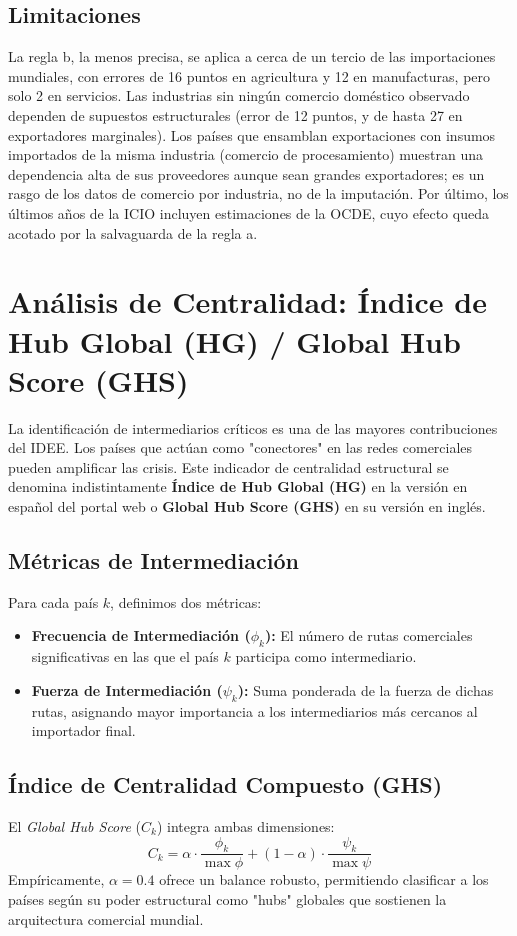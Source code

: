 \documentclass[final,1p,times,authoryear]{elsarticle}
\begin{document}
\subsection{Limitaciones}
La regla b, la menos precisa, se aplica a cerca de un tercio de las importaciones mundiales, con errores de 16 puntos en agricultura y 12 en manufacturas, pero solo 2 en servicios. Las industrias sin ningún comercio doméstico observado dependen de supuestos estructurales (error de 12 puntos, y de hasta 27 en exportadores marginales). Los países que ensamblan exportaciones con insumos importados de la misma industria (comercio de procesamiento) muestran una dependencia alta de sus proveedores aunque sean grandes exportadores; es un rasgo de los datos de comercio por industria, no de la imputación. Por último, los últimos años de la ICIO incluyen estimaciones de la OCDE, cuyo efecto queda acotado por la salvaguarda de la regla a.

\section{Análisis de Centralidad: Índice de Hub Global (HG) / Global Hub Score (GHS)}

La identificación de intermediarios críticos es una de las mayores contribuciones del IDEE. Los países que actúan como "conectores" en las redes comerciales pueden amplificar las crisis. Este indicador de centralidad estructural se denomina indistintamente \textbf{Índice de Hub Global (HG)} en la versión en español del portal web o \textbf{Global Hub Score (GHS)} en su versión en inglés.

\subsection{Métricas de Intermediación}
Para cada país $k$, definimos dos métricas:
\begin{itemize}
    \item \textbf{Frecuencia de Intermediación ($\phi_k$):} El número de rutas comerciales significativas en las que el país $k$ participa como intermediario.
    \item \textbf{Fuerza de Intermediación ($\psi_k$):} Suma ponderada de la fuerza de dichas rutas, asignando mayor importancia a los intermediarios más cercanos al importador final.
\end{itemize}

\subsection{Índice de Centralidad Compuesto (GHS)}
El \textit{Global Hub Score} ($C_k$) integra ambas dimensiones:
\begin{equation}
C_k = \alpha \cdot \frac{\phi_k}{\max \phi} + (1-\alpha) \cdot \frac{\psi_k}{\max \psi}
\end{equation}
Empíricamente, $\alpha = 0.4$ ofrece un balance robusto, permitiendo clasificar a los países según su poder estructural como "hubs" globales que sostienen la arquitectura comercial mundial.
\end{document}

